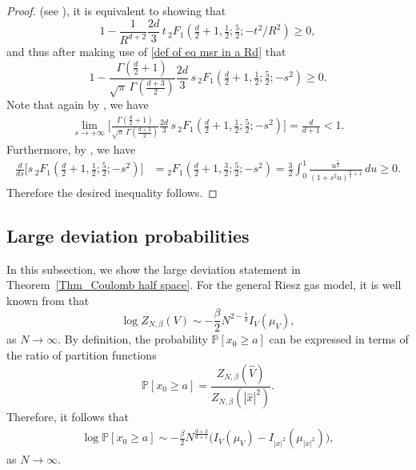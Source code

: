 \documentclass[10pt]{amsart}
\theoremstyle{plain}
\theoremstyle{remark}
\numberwithin{equation}{section}
\begin{document}
\begin{proof}
(see \cite[Eq.(15.5.1)]{NIST}), it is equivalent to showing that
\begin{equation}
1-\frac{1}{R^{d+2}}  \frac{2d}{3}\,t \,  {}_2F_1( \tfrac{d}{2}+1, \tfrac12; \tfrac{5}{2}; -t^2/R^2 ) \ge 0,  
\end{equation}
and thus after making use of \eqref{def of eq msr in a Rd} that
\begin{equation}
1-  \frac{ \Gamma(\frac{d}{2}+1)  } { \sqrt{\pi} \, \Gamma(\frac{d+3}{2})   }    \frac{2d}{3}\,s \,  {}_2F_1( \tfrac{d}{2}+1, \tfrac12; \tfrac{5}{2}; -s^2 ) \ge 0.  
\end{equation}
Note that again by \cite[Eq.(15.8.2)]{NIST}, we have
\begin{align*}
\lim_{ s \to +\infty } \Big[  \frac{ \Gamma(\frac{d}{2}+1)  } { \sqrt{\pi} \, \Gamma(\frac{d+3}{2})   }    \frac{2d}{3}\,s \,  {}_2F_1( \tfrac{d}{2}+1, \tfrac12; \tfrac{5}{2}; -s^2 ) \Big] = \frac{d}{d+1}<1. 
\end{align*}
Furthermore, by \cite[Eq.(15.5.3)]{NIST}, we have 
\begin{align*}
\frac{d}{ds}\Big[ s \,  {}_2F_1( \tfrac{d}{2}+1, \tfrac12; \tfrac{5}{2}; -s^2 ) \Big] &=   {}_2F_1( \tfrac{d}{2}+1, \tfrac32; \tfrac{5}{2}; -s^2 ) 
= \frac32 \int_0^1 \frac{ u^{\frac12} }{ (1+s^2u)^{ \frac{d}{2}+1 } }\,du \ge 0. 
\end{align*} 
Therefore the desired inequality follows. 
\end{proof}




 
 
\subsection{Large deviation probabilities} \label{S43}

In this subsection, we show the large deviation statement in Theorem~\ref{Thm_Coulomb half space}. 
For the general Riesz gas model, it is well known from \cite[Corollary 1.1]{LS17} that 
\begin{equation}
\log Z_{N,\beta}(V) \sim -\frac{\beta}{2} N^{ 2-\frac{s}{d} } I_V(\mu_V), 
\end{equation}
as $N\to \infty$.  
By definition, the probability $\mathbb{P}[x_0 \ge a]$ can be expressed in terms of the ratio of partition functions
\begin{equation}
  \mathbb{P}[x_0 \ge a] =  \frac{ Z_{N,\beta}(\hat{V}) }{  Z_{N,\beta}(|\hat{x}|^2) }. 
\end{equation}
Therefore, it follows that 
\begin{align}
\log   \mathbb{P}[x_0 \ge a] \sim -\frac{\beta}{2} N^{ \frac{d+3}{d+1} }  \Big( I_V(\mu_V) - I_{ |x|^2 }(\mu_{|x|^2}) \Big),
\end{align}
as $N \to \infty.$
 
\end{document}
